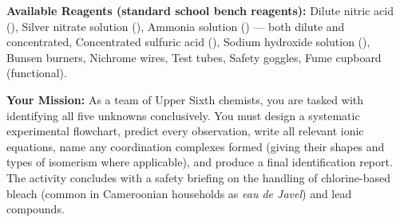 \documentclass[11pt]{article}
\begin{document}
\textbf{Available Reagents (standard school bench reagents):}
Dilute nitric acid (), Silver nitrate solution (), Ammonia solution () — both dilute and concentrated, Concentrated sulfuric acid (), Sodium hydroxide solution (), Bunsen burners, Nichrome wires, Test tubes, Safety goggles, Fume cupboard (functional).

\textbf{Your Mission:} As a team of Upper Sixth chemists, you are tasked with identifying all five unknowns conclusively. You must design a systematic experimental flowchart, predict every observation, write all relevant ionic equations, name any coordination complexes formed (giving their shapes and types of isomerism where applicable), and produce a final identification report. The activity concludes with a safety briefing on the handling of chlorine-based bleach (common in Cameroonian households as \emph{eau de Javel}) and lead compounds.
\end{document}
